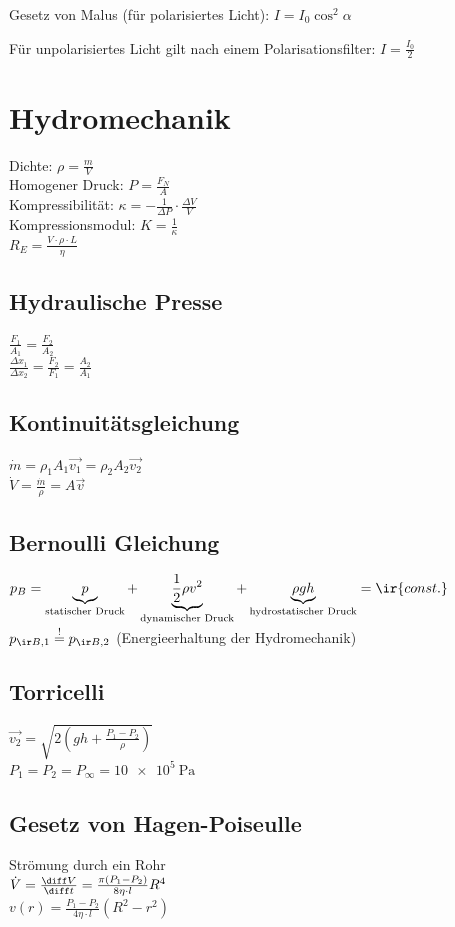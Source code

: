 \documentclass[german]{latex4ei/latex4ei_sheet}
\begin{document}
Gesetz von Malus (für polarisiertes Licht): $I = I_0 \cos^2 \alpha$

Für unpolarisiertes Licht gilt nach einem Polarisationsfilter: $I = \frac{I_0}{2}$


\section{Hydromechanik}
Dichte: $\rho=\frac{m}{V}$\\
Homogener Druck: $P=\frac{F_N}{A}$\\
Kompressibilität: $\kappa = -\frac{1}{\Delta P}\cdot \frac{\Delta V}{V}$\\
Kompressionsmodul: $K=\frac{1}{\kappa}$\\
$R_E= \frac{V\cdot \rho \cdot L}{\eta}$

\subsection{Hydraulische Presse}
$\frac{F_1}{A_1}=\frac{F_2}{A_2}$ \\
$\frac{\Delta x_1}{\Delta x_2}=\frac{F_2}{F_1}=\frac{A_2}{A_1}$
\subsection{Kontinuitätsgleichung}
$\dot{m}=\rho_1 A_1 \vec{v_1}=\rho_2 A_2 \vec{v_2}$\\
$\dot{V}=\frac{\dot{m}}{\rho}=A\vec{v}$

\subsection{Bernoulli Gleichung}
$p_B=\underbrace{p}_{\text{statischer Druck}} 
+ \underbrace{\frac{1}{2} \rho v^2}_{\text{dynamischer Druck}} 
+ \underbrace{\rho gh}_{\text{hydrostatischer Druck}} = \ir{const.}$\\
$p_{\ir B,1}\stackrel{!}{=}p_{\ir B,2}$
(Energieerhaltung der Hydromechanik)

\subsection{Torricelli}
$\vec{v_2}=\sqrt{2(gh+\frac{P_1-P_2}{\rho})}$\\
$P_1=P_2=P_\infty = \SI{10e5}{\pascal}$

\subsection{Gesetz von Hagen-Poiseulle}
Strömung durch ein Rohr\\
$\dot{V}=\frac{\diff V}{\diff t}=\frac{\pi (P_1-P_2)}{8\eta \cdot l}R^4$\\
$v(r)=\frac{P_1-P_2}{4\eta \cdot l}(R^2-r^2)$
\end{document}
